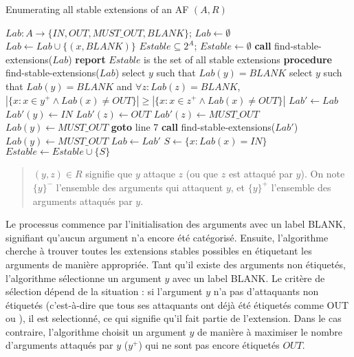 \documentclass{rapportECL}
\begin{document}
\begin{itemize}
	\begin{algorithm}
		\caption{Enumerating all stable extensions of an AF $(A, R)$}
		\begin{algorithmic}[1]
			\STATE $Lab : A \to \{IN, OUT,  MUST\_OUT, BLANK\}$; $Lab \gets \emptyset$
				\STATE $Lab \gets Lab \cup \{(x, BLANK)\}$
			\ENDFOR
			\STATE $Estable \subseteq 2^A$; $Estable \gets \emptyset$
			\STATE \textbf{call} find-stable-extensions($Lab$)
			\STATE \textbf{report} $Estable$ is the set of all stable extensions
			\STATE \textbf{procedure} find-stable-extensions($Lab$)
					\STATE select $y$ such that $Lab(y) = BLANK$
				\ELSE
					\STATE select $y$ such that $Lab(y) = BLANK$ and $\forall z : Lab(z) = BLANK$, 
					\STATE $\left| \{x : x \in {y}^+ \land Lab(x) \neq OUT \} \right| \geq \left| \{x : x \in {z}^+ \land Lab(x) \neq OUT \} \right|$
				\ENDIF
				\STATE $Lab' \gets Lab$
				\STATE $Lab'(y) \gets IN$
					\STATE $Lab'(z) \gets OUT$
				\ENDFOR
						\STATE $Lab'(z) \gets  MUST\_OUT$
					\ENDIF
						\STATE $Lab(y) \gets  MUST\_OUT$
					\ENDIF
				\ENDFOR
				\STATE \textbf{goto} line 7
				\STATE \textbf{call} find-stable-extensions($Lab'$)
					\STATE $Lab(y) \gets  MUST\_OUT$
				\ELSE
					\STATE $Lab \gets Lab'$
				\ENDIF
					\STATE $S \gets \{x : Lab(x) = IN\}$
					\STATE $Estable \gets Estable \cup \{S\}$
				\ENDIF
			\ENDWHILE
		\end{algorithmic}
	\end{algorithm}
	\begin{quote}
$(y, z) \in R$ signifie que $y$ attaque $z$ (ou que $z$ est attaqué par $y$).  
On note $\{y\}^-$ l'ensemble des arguments qui attaquent $y$,  
et $\{y\}^+$ l'ensemble des arguments attaqués par $y$.  
	\end{quote}	


Le processus commence par l'initialisation des arguments avec un label  {BLANK}, signifiant qu'aucun argument n'a encore été catégorisé. 
Ensuite, l'algorithme cherche à trouver toutes les extensions stables possibles en étiquetant les arguments de manière appropriée. 
Tant qu'il existe des arguments non étiquetés, l'algorithme sélectionne un argument \( y \) avec un label  {BLANK}. 
Le critère de sélection dépend de la situation : si l'argument \( y \) n'a pas d'attaquants non étiquetés (c'est-à-dire que tous ses attaquants ont déjà été étiquetés comme  {OUT} ou ), il est selectionné, 
ce qui signifie qu'il fait partie de l'extension.  Dans le cas contraire, l'algorithme choisit un argument \( y \) de manière à maximiser le nombre d'arguments attaqués par \( y \) (\( {y}^+ \)) qui ne sont pas encore étiquetés \(  {OUT} \).



\end{itemize}
\end{document}
